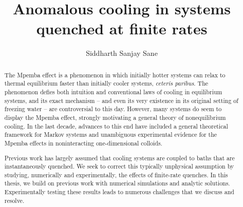 \documentclass[hyperref={colorlinks=true, urlcolor=blue, citecolor=blue, final, bound}]{sfuthesis}
\title{Anomalous cooling in systems quenched at finite rates}
\author{Siddharth Sanjay Sane}
\begin{document}
\frontmatter
\maketitle{}
\makecommittee{}


\begin{abstract}
The Mpemba effect is a phenomenon in which initially hotter systems can relax to thermal equilibrium faster than initially cooler systems, \textit{ceteris paribus}. The phenomenon defies both intuition and conventional laws of cooling in equilibrium systems, and its exact mechanism -- and even its very existence in its original setting of freezing water -- are controversial to this day. However, many systems do seem to display the Mpemba effect, strongly motivating a general theory of nonequilibrium cooling. In the last decade, advances to this end have included a general theoretical framework for Markov systems and unambiguous experimental evidence for the Mpemba effects in noninteracting one-dimensional colloids. 

Previous work has largely assumed that cooling systems are coupled to baths that are instantaneously quenched. We seek to correct this typically unphysical assumption by studying, numerically and experimentally, the effects of finite-rate quenches. In this thesis, we build on previous work with numerical simulations and analytic solutions. Experimentally testing these results leads to numerous challenges that we discuss and resolve.

\end{abstract}


\end{document}
